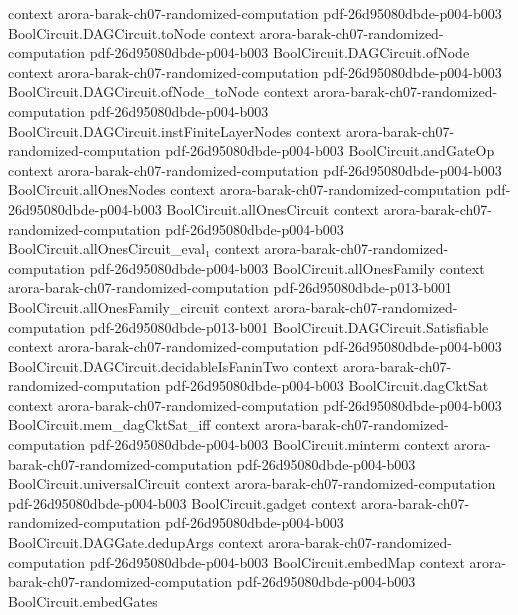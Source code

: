 \begin{theorem}
  {context}
  {arora-barak-ch07-randomized-computation}
  {pdf-26d95080dbde-p004-b003}
\proofstep
  {BoolCircuit.DAGCircuit.toNode}
  {context}
  {arora-barak-ch07-randomized-computation}
  {pdf-26d95080dbde-p004-b003}
\proofstep
  {BoolCircuit.DAGCircuit.ofNode}
  {context}
  {arora-barak-ch07-randomized-computation}
  {pdf-26d95080dbde-p004-b003}
\proofstep
  {BoolCircuit.DAGCircuit.ofNode_toNode}
  {context}
  {arora-barak-ch07-randomized-computation}
  {pdf-26d95080dbde-p004-b003}
\proofstep
  {BoolCircuit.DAGCircuit.instFiniteLayerNodes}
  {context}
  {arora-barak-ch07-randomized-computation}
  {pdf-26d95080dbde-p004-b003}
\proofstep
  {BoolCircuit.andGateOp}
  {context}
  {arora-barak-ch07-randomized-computation}
  {pdf-26d95080dbde-p004-b003}
\proofstep
  {BoolCircuit.allOnesNodes}
  {context}
  {arora-barak-ch07-randomized-computation}
  {pdf-26d95080dbde-p004-b003}
\proofstep
  {BoolCircuit.allOnesCircuit}
  {context}
  {arora-barak-ch07-randomized-computation}
  {pdf-26d95080dbde-p004-b003}
\proofstep
  {BoolCircuit.allOnesCircuit_eval₁}
  {context}
  {arora-barak-ch07-randomized-computation}
  {pdf-26d95080dbde-p004-b003}
\proofstep
  {BoolCircuit.allOnesFamily}
  {context}
  {arora-barak-ch07-randomized-computation}
  {pdf-26d95080dbde-p013-b001}
\proofstep
  {BoolCircuit.allOnesFamily_circuit}
  {context}
  {arora-barak-ch07-randomized-computation}
  {pdf-26d95080dbde-p013-b001}
\proofstep
  {BoolCircuit.DAGCircuit.Satisfiable}
  {context}
  {arora-barak-ch07-randomized-computation}
  {pdf-26d95080dbde-p004-b003}
\proofstep
  {BoolCircuit.DAGCircuit.decidableIsFaninTwo}
  {context}
  {arora-barak-ch07-randomized-computation}
  {pdf-26d95080dbde-p004-b003}
\proofstep
  {BoolCircuit.dagCktSat}
  {context}
  {arora-barak-ch07-randomized-computation}
  {pdf-26d95080dbde-p004-b003}
\proofstep
  {BoolCircuit.mem_dagCktSat_iff}
  {context}
  {arora-barak-ch07-randomized-computation}
  {pdf-26d95080dbde-p004-b003}
\proofstep
  {BoolCircuit.minterm}
  {context}
  {arora-barak-ch07-randomized-computation}
  {pdf-26d95080dbde-p004-b003}
\proofstep
  {BoolCircuit.universalCircuit}
  {context}
  {arora-barak-ch07-randomized-computation}
  {pdf-26d95080dbde-p004-b003}
\proofstep
  {BoolCircuit.gadget}
  {context}
  {arora-barak-ch07-randomized-computation}
  {pdf-26d95080dbde-p004-b003}
\proofstep
  {BoolCircuit.DAGGate.dedupArgs}
  {context}
  {arora-barak-ch07-randomized-computation}
  {pdf-26d95080dbde-p004-b003}
\proofstep
  {BoolCircuit.embedMap}
  {context}
  {arora-barak-ch07-randomized-computation}
  {pdf-26d95080dbde-p004-b003}
\proofstep
  {BoolCircuit.embedGates}

\end{theorem}
